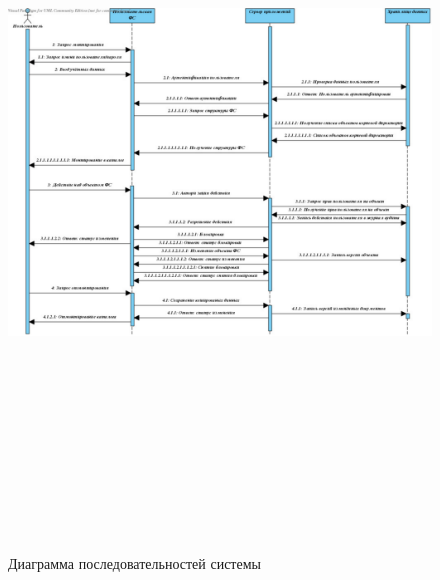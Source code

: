 \documentclass[utf8,usehyperref,12pt]{G7-32}
\renewcommand\appendixname{Приложение}
\begin{document}


\def\thechapter{A}
\begin{figure}[h]
   \centering%
   \includegraphics[height=200mm, width=1\textwidth, angle=90, clip, keepaspectratio]{pictures/client_sequencs}
   \caption{Диаграмма последовательностей системы}\label{fig:appendix_client_sequencs}
 \end{figure}
\end{document}
